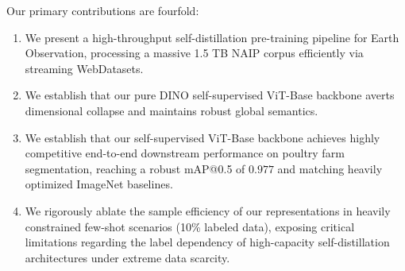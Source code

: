 Our primary contributions are fourfold:
\begin{enumerate}
    \item We present a high-throughput self-distillation pre-training pipeline for Earth Observation, processing a massive 1.5 TB NAIP corpus efficiently via streaming WebDatasets.
    \item We establish that our pure DINO self-supervised ViT-Base backbone averts dimensional collapse and maintains robust global semantics.
    \item We establish that our self-supervised ViT-Base backbone achieves highly competitive end-to-end downstream performance on poultry farm segmentation, reaching a robust mAP@0.5 of $0.977$ and matching heavily optimized ImageNet baselines.
    \item We rigorously ablate the sample efficiency of our representations in heavily constrained few-shot scenarios (10\% labeled data), exposing critical limitations regarding the label dependency of high-capacity self-distillation architectures under extreme data scarcity.
\end{enumerate}
